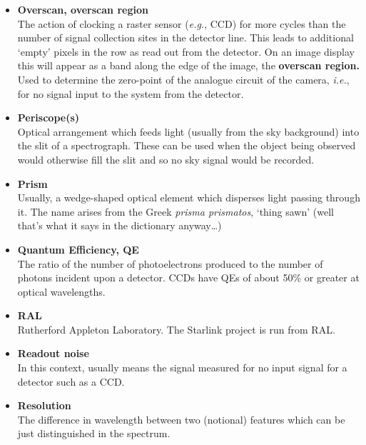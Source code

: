 \documentclass[twoside,11pt]{article}
\begin{document}
\begin{itemize}
\item {\bf\label{gl_overscan}Overscan, overscan region}\\
      The action of clocking a raster sensor ({\em{e.g.}}, CCD) for more
      cycles than the number of signal collection sites in the
      detector line.  This leads to additional `empty' pixels in the
      row as read out from the detector.  On an image display this
      will appear as a band along the edge of the image, the {\bf
      overscan region.}  Used to determine the zero-point of the
      analogue circuit of the camera, {\em i.e.}, for no signal input
      to the system from the detector.

\item {\bf\label{gl_periscopes}Periscope(s)}\\
      Optical arrangement which feeds light (usually from the sky
      background) into the slit of a spectrograph.  These can be used
      when the object being observed would otherwise fill the slit
      and so no sky signal would be recorded.

\item {\bf\label{gl_prism}Prism}\\
      Usually, a wedge-shaped optical element which disperses light
      passing through it.  The name arises from the Greek {\sl prisma
      prismatos}, `thing sawn' (well that's what it says in the
      dictionary anyway\ldots)

\item {\bf\label{gl_qe}Quantum Efficiency, QE}\\
      The ratio of the number of photoelectrons produced to the number
      of photons incident upon a detector.  CCDs have QEs of about
      50\% or greater at optical wavelengths.

\item {\bf\label{gl_dral}RAL}\\
      Rutherford Appleton Laboratory.  The Starlink project is
      run from RAL.

\item {\bf\label{gl_readout_noise}Readout noise}\\
      In this context, usually means the signal measured for no input
      signal for a detector such as a CCD.

\item {\bf\label{gl_resolution}Resolution}\\
      The difference in wavelength between two (notional) features
      which can be just distinguished in the spectrum.


\end{itemize}
\end{document}
